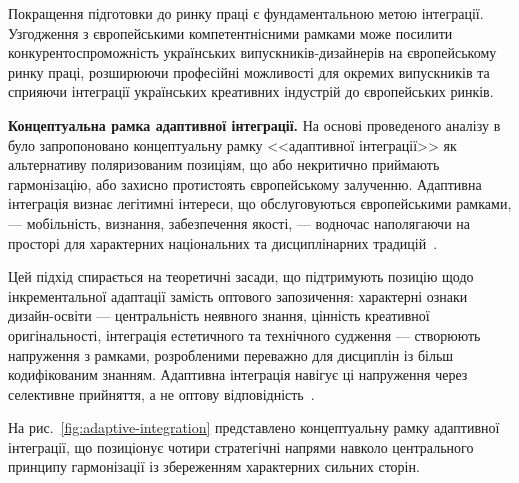 Покращення підготовки до ринку праці є фундаментальною метою інтеграції. Узгодження з європейськими компетентнісними рамками може посилити конкурентоспроможність українських випускників-дизайнерів на європейському ринку праці, розширюючи професійні можливості для окремих випускників та сприяючи інтеграції українських креативних індустрій до європейських ринків.

\textbf{Концептуальна рамка адаптивної інтеграції.} На основі проведеного аналізу в~\cite{Musiienko2025DesignEducation} було запропоновано концептуальну рамку <<адаптивної інтеграції>> як альтернативу поляризованим позиціям, що або некритично приймають гармонізацію, або захисно протистоять європейському залученню. Адаптивна інтеграція визнає легітимні інтереси, що обслуговуються європейськими рамками, --- мобільність, визнання, забезпечення якості, --- водночас наполягаючи на просторі для характерних національних та дисциплінарних традицій~\cite{Bohlinger2012279}.

Цей підхід спирається на теоретичні засади, що підтримують позицію щодо інкрементальної адаптації замість оптового запозичення: характерні ознаки дизайн-освіти --- центральність неявного знання, цінність креативної оригінальності, інтеграція естетичного та технічного судження --- створюють напруження з рамками, розробленими переважно для дисциплін із більш кодифікованим знанням. Адаптивна інтеграція навігує ці напруження через селективне прийняття, а не оптову відповідність~\cite{Musiienko2025DesignEducation}.

На рис.~\ref{fig:adaptive-integration} представлено концептуальну рамку адаптивної інтеграції, що позиціонує чотири стратегічні напрями навколо центрального принципу гармонізації із збереженням характерних сильних сторін.

